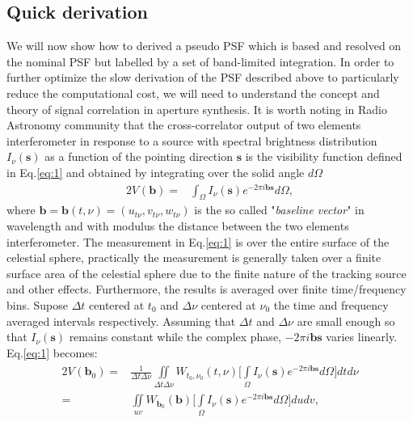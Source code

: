 \subsection{Quick derivation}
We will now show how to derived a pseudo PSF  which is based and resolved on the nominal PSF
but labelled by a set of band-limited integration.
In order to further optimize the slow derivation of the PSF described above to particularly reduce the computational
cost, we will need to understand the concept and theory of signal correlation in aperture synthesis.
It is worth noting in Radio Astronomy community that the cross-correlator output of two elements interferometer
in response to a source with spectral brightness distribution $I_{\nu}(\mathbf{s})$ as a function of the pointing direction $\mathbf{s}$ 
is the visibility function defined in Eq.\ref{eq:1} and obtained by integrating
over the solid angle $d\Omega$ \citep{thompson2008interferometry,taylor1999synthesis}
\begin{alignat}{2}
V_{}(\mathbf{b}) =& \int_{\Omega}I_{\nu}(\mathbf{s})e^{-2\pi i \mathbf{b}\mathbf{s}}d\Omega, \label{eq:1}
\end{alignat}
where $\mathbf{b}=\mathbf{b}(t,\nu)=(u_{t\nu}, v_{t\nu}, w_{t\nu})$  is the so called "\textit{baseline vector}" in wavelength
and with modulus the distance between the two elements
interferometer. The measurement in Eq.\ref{eq:1} is over the entire 
surface of the celestial sphere, practically the measurement is generally taken over a finite surface area of 
the celestial sphere due to the finite nature of the tracking source and other effects. Furthermore, the results is
averaged over finite time/frequency bins. Supose $\Delta t$ centered at $t_0$ and $\Delta \nu$ centered at $\nu_0$ the 
time and frequency averaged intervals respectively. 
Assuming that $\Delta t$ and  $\Delta \nu$ are small  enough so that $I_{\nu}(\mathbf{s})$
remains constant while the complex phase, $-2\pi i \mathbf{b}\mathbf{s}$ varies linearly.   Eq.\ref{eq:1} becomes:
\begin{alignat}{2}
V_{}(\mathbf{b}_0) =& \frac{1}{\Delta t \Delta \nu}\iint\limits_{\Delta t \Delta \nu}^{}W_{t_0,\nu_0}(t,\nu)\bigg[\int\limits_{\Omega}^{}I_{\nu}(\mathbf{s})e^{-2\pi i \mathbf{b}\mathbf{s}} d\Omega\bigg] dt d\nu \label{eq:2}\\	    
		    =& \iint\limits_{uv}^{}W_{\mathbf{b}_0}(\mathbf{b})\bigg[\int\limits_{\Omega}^{}I_{\nu}(\mathbf{s})e^{-2\pi i \mathbf{b}\mathbf{s}}d\Omega \bigg]du dv,  \label{eq:3}
\end{alignat}
